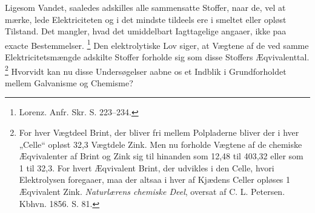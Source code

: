 \documentclass[12pt,a4paper]{book}
\renewcommand{\thefootnote}{*)}
\begin{document}
Ligesom Vandet, saaledes adskilles alle sammensatte Stoffer, naar de, vel
at mærke, lede Elektriciteten og i det mindste tildeels ere i smeltet
eller opløst Tilstand. Det mangler, hvad det umiddelbart Iagttagelige
angaaer, ikke paa exacte Bestemmelser.%
\footnote{%
Lorenz. Anfr. Skr. S. 223--234.}
Den elektrolytiske Lov siger, at Vægtene af de ved samme
Elektricitetsmængde adskilte Stoffer forholde sig som disse Stoffers
Æqvivalenttal.%
\renewcommand{\thefootnote}{**)}%
\footnote{%
For hver Vægtdeel Brint, der bliver fri mellem Polpladerne bliver der i
hver „Celle“ opløst 32,3 Vægtdele Zink. Men nu forholde Vægtene af de
chemiske Æqvivalenter af Brint og Zink sig til hinanden som 12,48 til
403,32 eller som 1 til 32,3. For hvert Æqvivalent Brint, der udvikles i
den Celle, hvori Elektrolysen foregaaer, maa der altsaa i hver af Kjædens
Celler opløses 1 Æqvivalent Zink. \emph{Naturlærens chemiske Deel},
oversat af C. L. Petersen. Kbhvn. 1856. S. 81.}%
\renewcommand{\thefootnote}{*)}
Hvorvidt kan nu disse Undersøgelser aabne os et Indblik i Grundforholdet
mellem Galvanisme og Chemisme?
\end{document}

